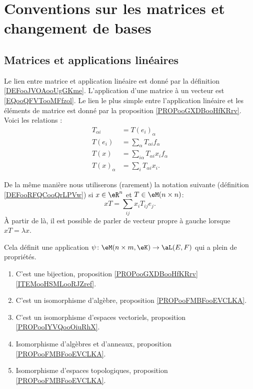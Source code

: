 \section{Conventions sur les matrices et changement de bases}
\label{SECooBTTTooZZABWA}

\subsection{Matrices et applications linéaires}
\label{SUBSECooAFPDooOzXdGz}

Le lien entre matrice et application linéaire est donné par la définition \ref{DEFooJVOAooUgGKme}. L'application d'une matrice à un vecteur est \eqref{EQooQFVTooMFfzol}. Le lien le plus simple entre l'application linéaire et les éléments de matrice est donné par la proposition \ref{PROPooGXDBooHfKRrv}. Voici les relations :
\begin{subequations}
	\begin{align}
		T_{\alpha i}  & =T(e_i)_{\alpha}                         \\
		T(e_i)        & =\sum_{\alpha}T_{\alpha i}f_{\alpha}     \\
		T(x)          & =\sum_{i\alpha}T_{\alpha i}x_if_{\alpha} \\
		T(x)_{\alpha} & =\sum_{i}T_{\alpha i}x_i.
	\end{align}
\end{subequations}

De la même manière nous utiliserons (rarement) la notation suivante (définition \ref{DEFooRFQCooQrLPVw}) si \( x\in \eR^n\) et \( T\in \eM(n\times n)\):
\begin{equation}
	xT=\sum_{ij}x_iT_{ij}e_j.
\end{equation}
À partir de là, il est possible de parler de vecteur propre à gauche lorsque \( xT=\lambda x\).

Cela définit une application \( \psi\colon \eM(n\times m, \eK)\to \aL(E,F)\) qui a plein de propriétés.
\begin{enumerate}
	\item
	      C'est une bijection, proposition \ref{PROPooGXDBooHfKRrv}\ref{ITEMooHSMLooRJZref}.
	\item
	      C'est un isomorphisme d'algèbre, proposition \ref{PROPooFMBFooEVCLKA}.
	\item
	      C'est un isomorphisme d'espaces vectoriels, proposition \ref{PROPooIYVQooOiuRhX}.
	\item
	      Isomorphisme d'algèbres et d'anneaux, proposition \ref{PROPooFMBFooEVCLKA}.
	\item
	      Isomorphisme d'espaces topologiques, proposition \ref{PROPooFMBFooEVCLKA}.
\end{enumerate}


